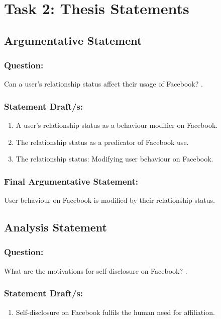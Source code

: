 \documentclass[12pt,a4paper]{report}
\begin{document}
\newpage
\section*{\textsf{Task 2: Thesis Statements}}

\subsection*{\textsf{Argumentative Statement}}

\subsubsection*{\textsf{Question:}}

Can a user's relationship status affect their usage of Facebook? \citep{McAndrew2012}.

\subsubsection*{\textsf{Statement Draft/s:}}
\begin{enumerate}
\item A user's relationship status as a behaviour modifier on Facebook.
\item The relationship status as a predicator of Facebook use.
\item The relationship status: Modifying user behaviour on Facebook.
\end{enumerate}

\subsubsection*{\textsf{Final Argumentative Statement:}}
User behaviour on Facebook is modified by their relationship status.

\subsection*{\textsf{Analysis Statement}}

\subsubsection*{\textsf{Question:}}
What are the motivations for self-disclosure on Facebook? \citep{Park2011}.

\subsubsection*{\textsf{Statement Draft/s:}}
\begin{enumerate}
\item Self-disclosure on Facebook fulfils the human need for affiliation.
\end{enumerate}
\end{document}
